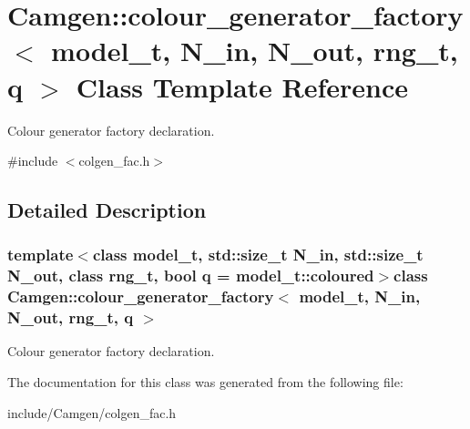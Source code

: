 \hypertarget{a00080}{}\section{Camgen\+:\+:colour\+\_\+generator\+\_\+factory$<$ model\+\_\+t, N\+\_\+in, N\+\_\+out, rng\+\_\+t, q $>$ Class Template Reference}
\label{a00080}


Colour generator factory declaration.  




{\ttfamily \#include $<$colgen\+\_\+fac.\+h$>$}



\subsection{Detailed Description}
\subsubsection*{template$<$class model\+\_\+t, std\+::size\+\_\+t N\+\_\+in, std\+::size\+\_\+t N\+\_\+out, class rng\+\_\+t, bool q = model\+\_\+t\+::coloured$>$class Camgen\+::colour\+\_\+generator\+\_\+factory$<$ model\+\_\+t, N\+\_\+in, N\+\_\+out, rng\+\_\+t, q $>$}

Colour generator factory declaration. 

The documentation for this class was generated from the following file\+:\begin{DoxyCompactItemize}
\item 
include/\+Camgen/colgen\+\_\+fac.\+h\end{DoxyCompactItemize}
